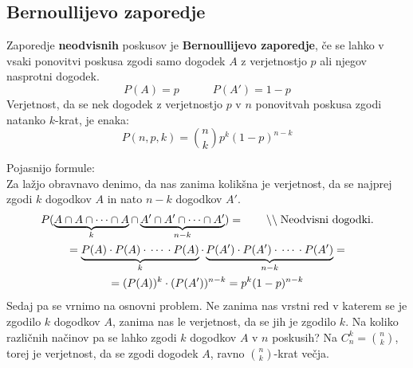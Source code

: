 \documentclass[a4paper,oneside,12pt,fleqn]{article}
\newcommand\krat\cdot
\newcommand{\comment}[1]{\ensuremath{\qquad\backslash\backslash\;}\textnormal{#1}}
\numberwithin{equation}{section}
\begin{document}
\subsection{Bernoullijevo zaporedje}
\label{sec:ver:bern}

Zaporedje \textbf{neodvisnih} poskusov je \textbf{Bernoullijevo zaporedje}, če se lahko v vsaki ponovitvi
poskusa zgodi samo dogodek $A$ z verjetnostjo $p$ ali njegov nasprotni dogodek.
\[ P(A) = p \qquad \quad P(A') = 1-p \]
Verjetnost, da se nek dogodek z verjetnostjo $p$ v $n$ ponovitvah poskusa zgodi natanko
$k$-krat, je enaka:
\[ P(n, p, k) = \binom{n}{k}p^k(1-p)^{n-k} \]

Pojasnijo formule:\\
Za lažjo obravnavo denimo, da nas zanima kolikšna je verjetnost, da se najprej zgodi
$k$ dogodkov $A$ in nato $n-k$ dogodkov $A'$.
\begin{gather*}
  P(\underbrace{A \cap A \cap \cdots \cap A}_k \cap \underbrace{A' \cap A' \cap \cdots
  \cap A'}_{n-k}) = \comment{Neodvisni dogodki.}\\
  = \underbrace{P(A)\krat P(A) \krat \, \cdots \, \krat P(A)}_k \krat
  \underbrace{P(A')\krat P(A')\krat \, \cdots \, \krat P(A')}_{n-k} = \\
  = (P(A))^k \krat (P(A'))^{n-k} = p^k(1-p)^{n-k}
\end{gather*}
Sedaj pa se vrnimo na osnovni problem. Ne zanima nas vrstni red v katerem se je zgodilo
$k$ dogodkov $A$, zanima nas le verjetnost, da se jih je zgodilo $k$. Na koliko 
različnih načinov pa se lahko zgodi $k$ dogodkov $A$ v $n$ poskusih? Na $C^k_n =
\binom{n}{k}$, torej je verjetnost, da se zgodi dogodek $A$, ravno $\binom{n}{k}$-krat večja.


\pagebreak
\listoffigures
\end{document}
